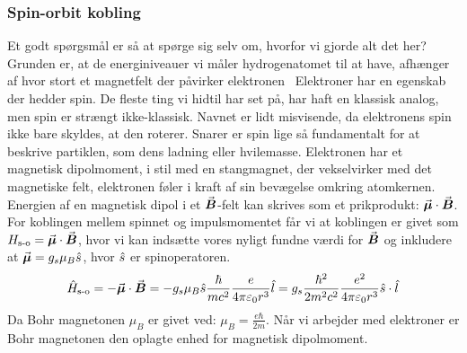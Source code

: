 \documentclass[../../Atom-ogMolekylefysik.tex]{subfiles}
\begin{document}
\subsubsection*{Spin-orbit kobling}
Et godt spørgsmål er så at spørge sig selv om, hvorfor vi gjorde alt det her? Grunden er, at de energiniveauer vi måler hydrogenatomet til at have, afhænger af hvor stort et magnetfelt der påvirker elektronen\
Elektroner har en egenskab der hedder spin. De fleste ting vi hidtil har set på, har haft en klassisk analog, men spin er strængt ikke-klassisk. Navnet er lidt misvisende, da elektronens spin ikke bare skyldes, at den roterer. Snarer er spin lige så fundamentalt for at beskrive partiklen, som dens ladning eller hvilemasse. Elektronen har et magnetisk dipolmoment, i stil med en stangmagnet, der vekselvirker med det magnetiske felt, elektronen føler i kraft af sin bevægelse omkring atomkernen.
Energien af en magnetisk dipol i et ${\vec{\boldsymbol{B}}}$-felt kan skrives som et prikprodukt: ${\vec{\boldsymbol{\mu}}}\cdot {\vec{\boldsymbol{B}}}$.
For koblingen mellem spinnet og impulsmomentet får vi at koblingen er givet som $H_\text{s-o}={\vec{\boldsymbol{\mu}}}\cdot{\vec{\boldsymbol{B}}}$, hvor vi kan indsætte vores nyligt fundne værdi for ${\vec{\boldsymbol{B}}}$ og inkludere at ${\vec{\boldsymbol{\mu}}}=g_s\mu_B\hat{s}$, hvor $\hat s$ er spinoperatoren.
\begin{equation}
    \hat H_\text{s-o}=-{\vec{\boldsymbol{\mu}}}\cdot{\vec{\boldsymbol{B}}}=-g_s\mu_B\hat{s}\frac{\hbar}{mc^2}\frac{e}{4\pi\varepsilon_0r^3}\hat{l}=g_s\frac{\hbar^2}{2m^2c^2}\frac{e^2}{4\pi\varepsilon_0r^3}\hat{s}\cdot\hat{l}
\end{equation}
Da Bohr magnetonen $\mu_B$ er givet ved: $\mu_B=\frac{e\hbar}{2m}$. Når vi arbejder med elektroner er Bohr magnetonen den oplagte enhed for magnetisk dipolmoment.
\end{document}
